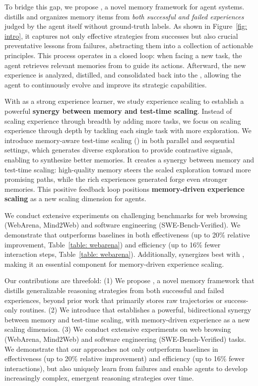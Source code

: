 To bridge this gap, we propose \textbf{\ours{}}, a novel memory framework for agent systems.
\ours{} distills and organizes memory items from \textit{both successful and failed experiences} judged by the agent itself without ground-truth labels.
As shown in Figure~\ref{fig: intro}, it captures not only effective strategies from successes but also crucial preventative lessons from failures, abstracting them into a collection of actionable principles.
This process operates in a closed loop: when facing a new task, the agent retrieves relevant memories from \ours{} to guide its actions. Afterward, the new experience is analyzed, distilled, and consolidated back into the \ours{}, allowing the agent to continuously evolve and improve its strategic capabilities.

With \ours{} as a strong experience learner, we study experience scaling to establish a powerful \textbf{synergy between memory and test-time scaling}.
Instead of scaling experience through breadth by adding more tasks, we focus on scaling experience through depth by tackling each single task with more exploration.
We introduce memory-aware test-time scaling (\textbf{\mats{}}) in both parallel and sequential settings, which generates diverse exploration to provide contrastive signals, enabling \ours{} to synthesize better memories.
It creates a synergy between memory and test-time scaling: high-quality memory steers the scaled exploration toward more promising paths, while the rich experiences generated forge even stronger memories.
This positive feedback loop positions \textbf{memory-driven experience scaling} as a new scaling dimension for agents.

We conduct extensive experiments on challenging benchmarks for web browsing (WebArena, Mind2Web) and software engineering (SWE-Bench-Verified). We demonstrate that \ours{} outperforms baselines in both effectiveness (up to 20\% relative improvement, Table~\ref{table: webarena}) and efficiency (up to 16\% fewer interaction steps, Table~\ref{table: webarena}). Additionally, \ours{} synergizes best with \mats{}, making it an essential component for memory-driven experience scaling.

Our contributions are threefold: (1) We propose \ours{}, a novel memory framework that distills generalizable reasoning strategies from both successful and failed experiences, beyond prior work that primarily stores raw trajectories or success-only routines. (2) We introduce \mats{} that establishes a powerful, bidirectional synergy between memory and test-time scaling, with memory-driven experience as a new scaling dimension. (3) We conduct extensive experiments on web browsing (WebArena, Mind2Web) and software engineering (SWE-Bench-Verified) tasks. We demonstrate that our approaches not only outperform baselines in effectiveness (up to 20\% relative improvement) and efficiency (up to 16\% fewer interactions), but also uniquely learn from failures and enable agents to develop increasingly complex, emergent reasoning strategies over time.